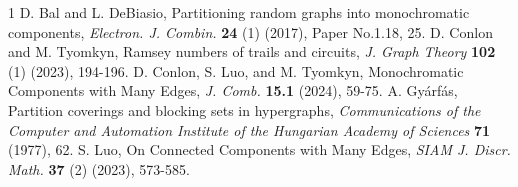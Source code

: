 \documentclass[12pt]{amsart}
\theoremstyle{definition}
\numberwithin{equation}{section}
\begin{document}
\begin{thebibliography}{1}
     D. Bal and L. DeBiasio, Partitioning random graphs into monochromatic components, \emph{Electron. J. Combin.} \textbf{24} (1) (2017), Paper No.1.18, 25.
     D. Conlon and M. Tyomkyn, Ramsey numbers of trails and circuits, \emph{J. Graph Theory} \textbf{102} (1) (2023), 194-196.
	 D. Conlon, S. Luo, and M. Tyomkyn, Monochromatic Components with Many Edges, \emph{J. Comb.} \textbf{15.1} (2024), 59-75.
     A. Gy\'arf\'as, Partition coverings and blocking sets in hypergraphs, \emph{Communications of the Computer and Automation Institute of the Hungarian Academy of Sciences} \textbf{71} (1977), 62.
	 S. Luo, On Connected Components with Many Edges, \emph{SIAM J. Discr. Math.} \textbf{37} (2) (2023), 573-585.
\end{thebibliography}
\end{document}
